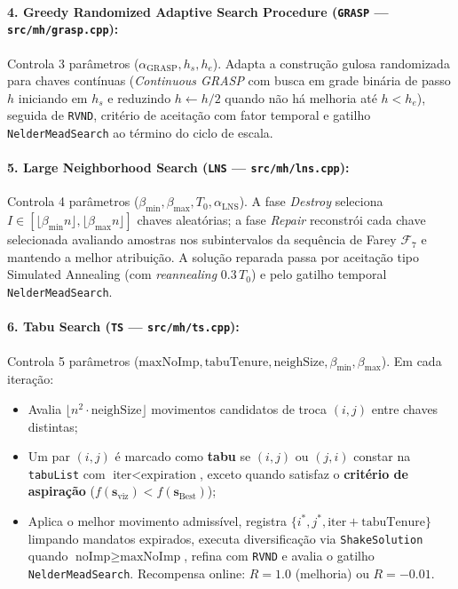 \documentclass[11pt,a4paper]{article}
\begin{document}
\paragraph{4. Greedy Randomized Adaptive Search Procedure (\texttt{GRASP} --- \texttt{src/mh/grasp.cpp}):}
Controla 3 parâmetros ($\alpha_{\text{GRASP}}, h_s, h_e$). Adapta a construção gulosa randomizada para chaves contínuas (\emph{Continuous GRASP} com busca em grade binária de passo $h$ iniciando em $h_s$ e reduzindo $h \leftarrow h/2$ quando não há melhoria até $h < h_e$), seguida de \texttt{RVND}, critério de aceitação com fator temporal e gatilho \texttt{NelderMeadSearch} ao término do ciclo de escala.

\paragraph{5. Large Neighborhood Search (\texttt{LNS} --- \texttt{src/mh/lns.cpp}):}
Controla 4 parâmetros ($\beta_{\min}, \beta_{\max}, T_0, \alpha_{\text{LNS}}$). A fase \emph{Destroy} seleciona $I \in [\lfloor \beta_{\min} n \rfloor, \lfloor \beta_{\max} n \rfloor]$ chaves aleatórias; a fase \emph{Repair} reconstrói cada chave selecionada avaliando amostras nos subintervalos da sequência de Farey $\mathcal{F}_7$ e mantendo a melhor atribuição. A solução reparada passa por aceitação tipo Simulated Annealing (com \emph{reannealing} $0.3\,T_0$) e pelo gatilho temporal \texttt{NelderMeadSearch}.

\paragraph{6. Tabu Search (\texttt{TS} --- \texttt{src/mh/ts.cpp}):}
Controla 5 parâmetros ($\text{maxNoImp}, \text{tabuTenure}, \text{neighSize}, \beta_{\min}, \beta_{\max}$). Em cada iteração:
\begin{itemize}[leftmargin=*]
  \item Avalia $\lfloor n^2 \cdot \text{neighSize} \rfloor$ movimentos candidatos de troca $(i, j)$ entre chaves distintas;
  \item Um par $(i,j)$ é marcado como \textbf{tabu} se $(i,j)$ ou $(j,i)$ constar na \texttt{tabuList} com $\text{iter} < \text{expiration}$, exceto quando satisfaz o \textbf{critério de aspiração} ($f(\mathbf{s}_{\text{viz}}) < f(\mathbf{s}_{\text{Best}})$);
  \item Aplica o melhor movimento admissível, registra $\{i^*, j^*, \text{iter} + \text{tabuTenure}\}$ limpando mandatos expirados, executa diversificação via \texttt{ShakeSolution} quando $\text{noImp} \ge \text{maxNoImp}$, refina com \texttt{RVND} e avalia o gatilho \texttt{NelderMeadSearch}. Recompensa online: $R = 1.0$ (melhoria) ou $R = -0.01$.
\end{itemize}
\end{document}
